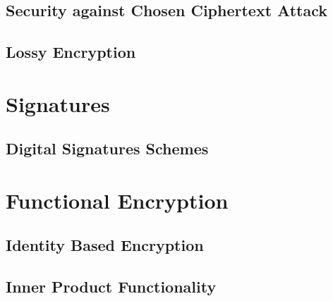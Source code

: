 	\section{Security against Chosen Ciphertext Attack}
	
	
	\section{Lossy Encryption}
	

\chapter{Signatures}
	\section{Digital Signatures Schemes}
	

\chapter{Functional Encryption}
	\section{Identity Based Encryption}
	
	
	
	\section{Inner Product Functionality}
	
	
	





\appendix


